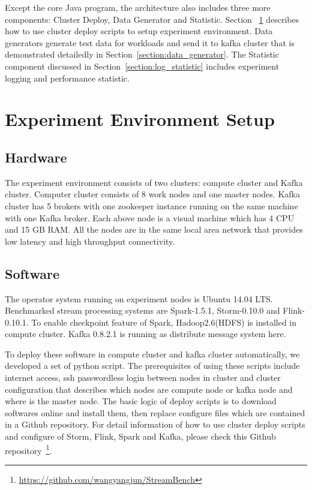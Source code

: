 Except the core Java program, the architecture also includes three more components: Cluster Deploy, Data Generator and Statistic. Section ~\ref{chapter:environment_setup} describes how to use cluster deploy scripts to setup experiment environment. Data generators generate test data for workloads and send it to kafka cluster that is demonstrated detailedly in Section~\ref{section:data_generator}. The Statistic component discussed in Section~\ref{section:log_statistic} includes experiment logging and performance statistic. 

\section{Experiment Environment Setup}
\label{chapter:environment_setup}

\subsection{Hardware}

The experiment environment consists of two clusters: compute cluster and Kafka cluster. Computer cluster consists of 8 work nodes and one master nodes. Kafka cluster has 5 brokers with one zookeeper instance running on the same machine with one Kafka broker. Each above node is a visual machine which has 4 CPU and 15 GB RAM. All the nodes are in the same local area network that provides low latency and high throughput connectivity. 

\subsection{Software}
The operator system running on experiment nodes is Ubuntu 14.04 LTS. Benchmarked stream processing systems are Spark-1.5.1, Storm-0.10.0 and Flink-0.10.1. To enable checkpoint feature of Spark, Hadoop2.6(HDFS) is installed in compute cluster. Kafka 0.8.2.1 is running as distribute message system here. 

To deploy these software in compute cluster and kafka cluster automatically, we developed a set of python script. The prerequisites of using these scripts include internet access, ssh passwordless login between nodes in cluster and cluster configuration that describes which nodes are compute node or kafka node and where is the master node. The basic logic of deploy scripts is to download softwares online and install them, then replace configure files which are contained in a Github repository. For detail information of how to use cluster deploy scripts and configure of Storm, Flink, Spark and Kafka, please check this Github repository~\footnote{\url{https://github.com/wangyangjun/StreamBench}}.

